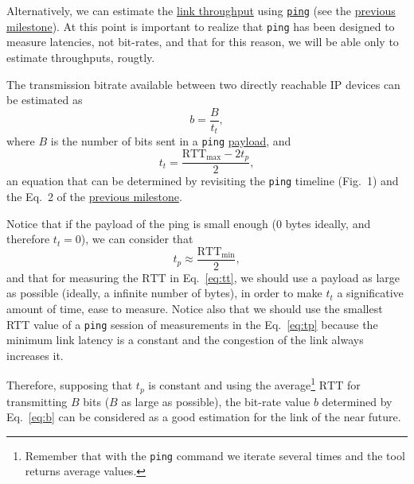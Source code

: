 Alternatively, we can estimate the
\href{https://en.wikipedia.org/wiki/Throughput}{link throughput} using
\href{https://github.com/torvalds/linux/blob/master/net/ipv4/ping.c}{\texttt{ping}}
(see the
\href{https://tecnologias-multimedia.github.io/study_guide/latency/}{previous
  milestone}). At this point is important to realize that
\texttt{ping} has been designed to measure latencies, not bit-rates,
and that for this reason, we will be able only to estimate
throughputs, rougtly.

The transmission bitrate available between two directly reachable IP
devices can be estimated as
\begin{equation}
  b=\frac{B}{t_t},
  \label{eq:b}
\end{equation}
where $B$ is the number of bits sent in a \verb|ping|
\href{https://en.wikipedia.org/wiki/Payload_(computing)}{payload}, and
\begin{equation}
  t_t = \frac{\text{RTT}_{\text{max}}-2t_p}{2},
  \label{eq:tt}
\end{equation}
an equation that can be determined by revisiting the \verb|ping|
timeline (Fig.~1) and the Eq.~2 of the
\href{https://tecnologias-multimedia.github.io/study_guide/latency/}{previous
  milestone}.

Notice that if the payload of the ping is small enough ($0$ bytes
ideally, and therefore $t_t=0$), we can consider that
\begin{equation}
  t_p \approx \frac{\text{RTT}_{\text{min}}}{2},
  \label{eq:tp}
\end{equation}
and that for measuring the $\text{RTT}$ in Eq.~\eqref{eq:tt}, we
should use a payload as large as possible (ideally, a infinite number
of bytes), in order to make $t_t$ a significative amount of time, ease
to measure. Notice also that we should use the smallest RTT value of a
\texttt{ping} session of measurements in the Eq.~\eqref{eq:tp} because
the minimum link latency is a constant and the congestion of the link
always increases it.

Therefore, supposing that $t_p$ is constant and using the
average\footnote{Remember that with the \texttt{ping} command we
iterate several times and the tool returns average values.}
$\text{RTT}$ for transmitting $B$ bits ($B$ as large as possible), the
bit-rate value $b$ determined by Eq.~\eqref{eq:b} can be considered as
a good estimation for the link of the near future.

